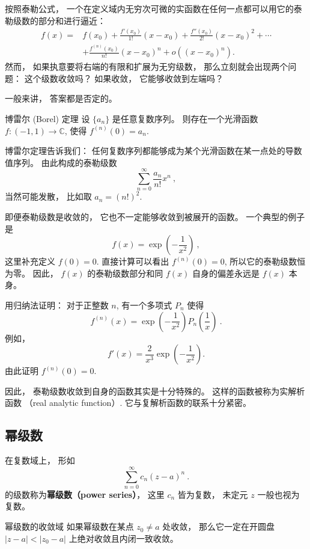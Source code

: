 

按照泰勒公式， 一个在定义域内无穷次可微的实函数在任何一点都可以用它的泰勒级数的部分和进行逼近：
$$
\begin{aligned}
f(x)=&f(x_0)+\frac{f'(x_0)}{1!}(x-x_0)+\frac{f''(x_0)}{2!}(x-x_0)^2+\cdots\\
&+\frac{f^{(n)}(x_0)}{n!}(x-x_0)^n+o((x-x_0)^n).
\end{aligned}
$$
然而， 如果执意要将右端的有限和扩展为无穷级数， 那么立刻就会出现两个问题： 这个级数收敛吗？ 如果收敛， 它能够收敛到左端吗？

一般来讲， 答案都是否定的。 

\begin{theorem}{博雷尔 (Borel) 定理}
设 $\{a_n\}$ 是任意复数序列。 则存在一个光滑函数 $f:(-1,1)\to\mathbb{C}$, 使得 $f^{(n)}(0)=a_n$.
\end{theorem}
博雷尔定理告诉我们： 任何复数序列都能够成为某个光滑函数在某一点处的导数值序列。 由此构成的泰勒级数
$$
\sum_{n=0}^\infty\frac{a_n}{n!}x^n~,
$$
当然可能发散， 比如取 $a_n=(n!)^2$.

即便泰勒级数是收敛的， 它也不一定能够收敛到被展开的函数。 一个典型的例子是
$$
f(x)=\exp\left(-\frac{1}{x^2}\right)~,
$$
这里补充定义 $f(0)=0$. 直接计算可以看出 $f^{(n)}(0)=0$, 所以它的泰勒级数恒为零。 因此， $f(x)$ 的泰勒级数部分和同 $f(x)$ 自身的偏差永远是 $f(x)$ 本身。

\begin{exercise}{}
用归纳法证明： 对于正整数 $n$, 有一个多项式 $P_n$ 使得
$$
f^{(n)}(x)=\exp\left(-\frac{1}{x^2}\right)P_n\left(\frac{1}{x}\right)~.
$$
例如， 
$$
f'(x)=\frac{2}{x^3}\exp\left(-\frac{1}{x^2}\right).
$$
由此证明 $f^{(n)}(0)=0$.
\end{exercise}

因此， 泰勒级数收敛到自身的函数其实是十分特殊的。 这样的函数被称为实解析函数 （real analytic function）. 它与复解析函数的联系十分紧密。

\subsection{幂级数}
在复数域上， 形如
\begin{equation}
\sum_{n=0}^\infty c_n(z-a)^n~.
\end{equation}
的级数称为\textbf{幂级数（power series）}， 这里 $c_n$ 皆为复数， 未定元 $z$ 一般也视为复数。 

\begin{theorem}{幂级数的收敛域}
如果幂级数在某点 $z_0\neq a$ 处收敛， 那么它一定在开圆盘 $|z-a|<|z_0-a|$ 上绝对收敛且内闭一致收敛。
\end{theorem}

